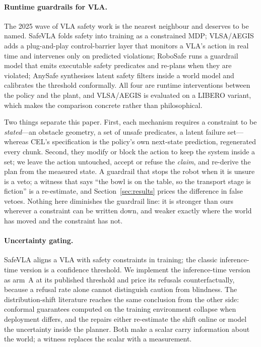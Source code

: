 \documentclass[conference]{IEEEtran}
\theoremstyle{definition}
\begin{document}
\paragraph{Runtime guardrails for VLA.} The 2025 wave of VLA safety work is the
nearest neighbour and deserves to be named. SafeVLA
\cite{zhang2025safevla} folds safety into training as a constrained MDP;
VLSA/AEGIS \cite{hu2025vlsa} adds a plug-and-play control-barrier layer that
monitors a VLA's action in real time and intervenes only on predicted
violations; RoboSafe \cite{wang2025robosafe} runs a guardrail model that emits
executable safety predicates and re-plans when they are violated; AnySafe
\cite{agrawal2025anysafe} synthesises latent safety filters inside a world model
and calibrates the threshold conformally. All four are runtime interventions
between the policy and the plant, and VLSA/AEGIS is evaluated on a LIBERO
variant, which makes the comparison concrete rather than philosophical.

Two things separate this paper. First, each mechanism requires a constraint to
be \emph{stated}---an obstacle geometry, a set of unsafe predicates, a latent
failure set---whereas CEL's specification is the policy's own next-state
prediction, regenerated every chunk. Second, they modify or block the action to
keep the system inside a set; we leave the action untouched, accept or refuse
the \emph{claim}, and re-derive the plan from the measured state. A guardrail
that stops the robot when it is unsure is a veto; a witness that says ``the bowl
is on the table, so the transport stage is fiction'' is a re-estimate, and
Section~\ref{sec:results} prices the difference in false vetoes. Nothing here
diminishes the guardrail line: it is stronger than ours wherever a constraint
can be written down, and weaker exactly where the world has moved and the
constraint has not.

\paragraph{Uncertainty gating.} SafeVLA \cite{zhang2025safevla} aligns a VLA
with safety constraints in training; the classic inference-time version is a
confidence threshold. We implement the inference-time version as arm~A at its
published threshold and price its refusals counterfactually, because a refusal
rate alone cannot distinguish caution from blindness. The distribution-shift
literature reaches the same conclusion from the other side: conformal guarantees
computed on the training environment collapse when deployment differs, and the
repairs either re-estimate the shift online \cite{rahaman2026environments} or
model the uncertainty inside the planner. Both make a scalar carry information
about the world; a witness replaces the scalar with a measurement.
\end{document}
